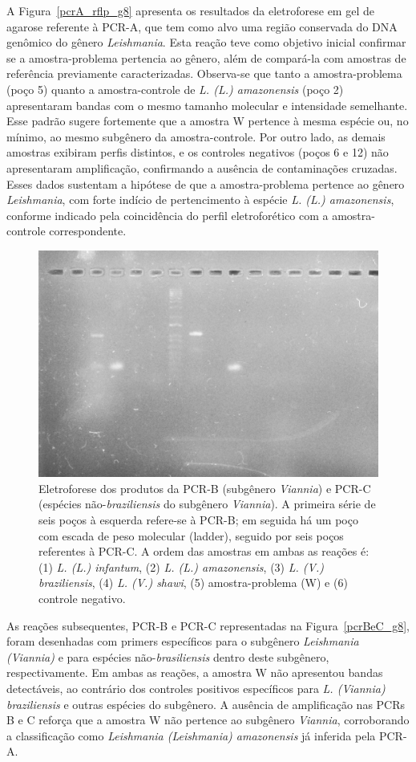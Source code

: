 A Figura~\ref{pcrA_rflp_g8} apresenta os resultados da eletroforese em gel de agarose referente à PCR-A, que tem como alvo uma região conservada do DNA genômico do gênero
 \textit{Leishmania}. Esta reação teve como objetivo inicial confirmar se a amostra-problema pertencia ao gênero, além de compará-la com amostras de referência previamente 
 caracterizadas. Observa-se que tanto a amostra-problema (poço 5) quanto a amostra-controle de \textit{L. (L.) amazonensis} (poço 2) apresentaram bandas com o mesmo tamanho 
 molecular e intensidade semelhante. Esse padrão sugere fortemente que a amostra W pertence à mesma espécie ou, no mínimo, ao mesmo subgênero da amostra-controle. Por outro 
 lado, as demais amostras  exibiram perfis distintos, e os controles negativos (poços 6 e 12) não apresentaram amplificação, confirmando a ausência de contaminações cruzadas.
Esses dados sustentam a hipótese de que a amostra-problema pertence ao gênero \textit{Leishmania}, com forte indício de pertencimento à espécie \textit{L. (L.) amazonensis}, 
conforme indicado pela coincidência do perfil eletroforético com a amostra-controle correspondente.

\begin{figure}
 \centering
 \includegraphics[width=.4\textwidth]{fig/pcrBeC_g8.jpg}
 \caption{Eletroforese dos produtos da PCR-B (subgênero \textit{Viannia}) e PCR-C (espécies não-\textit{braziliensis} do subgênero \textit{Viannia}). 
 A primeira série de seis poços à esquerda refere-se à PCR-B; em seguida há um poço com escada de peso molecular (ladder), seguido por seis poços referentes 
 à PCR-C. A ordem das amostras em ambas as reações é: (1) \textit{L. (L.) infantum}, (2) \textit{L. (L.) amazonensis}, (3) \textit{L. (V.) braziliensis}, 
 (4) \textit{L. (V.) shawi}, (5) amostra-problema (W) e (6) controle negativo.}
 \label{pcrBC}
 \end{figure}

As reações subsequentes, PCR-B e PCR-C representadas na Figura~\ref{pcrBeC_g8}, foram desenhadas com primers específicos para o subgênero \textit{Leishmania (Viannia)} e para espécies não-\textit{brasiliensis} dentro 
deste subgênero, respectivamente. Em ambas as reações, a amostra W não apresentou bandas detectáveis, ao contrário dos controles positivos específicos para \textit{L. (Viannia) 
braziliensis} e outras espécies do subgênero. A ausência de amplificação nas PCRs B e C reforça que a amostra W não pertence ao subgênero \textit{Viannia}, corroborando a classificação 
como \textit{Leishmania (Leishmania) amazonensis} já inferida pela PCR-A.


